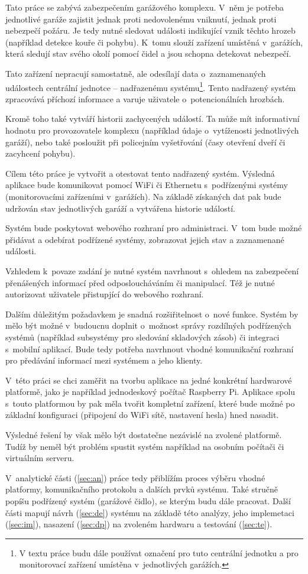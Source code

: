 Tato práce se zabývá zabezpečením garážového komplexu. V~něm je potřeba jednotlivé garáže zajistit jednak proti nedovolenému vniknutí, jednak proti nebezpečí požáru. Je tedy nutné sledovat události indikující vznik těchto hrozeb (například detekce kouře či pohybu). K~tomu slouží zařízení umístěná v~garážích, která sledují stav svého okolí pomocí čidel a jsou schopna detekovat nebezpečí. 

Tato zařízení nepracují samostatně, ale odesílají data o~zaznamenaných událostech centrální jednotce -- nadřazenému systému\footnote{V textu práce budu dále používat označení  pro tuto centrální jednotku a  pro monitorovací zařízení umístěna v~jednotlivých garážích.}. Tento nadřazený systém zpracovává příchozí informace a varuje uživatele o~potencionálních hrozbách.

Kromě toho také vytváří historii zachycených událostí. Ta může mít informativní hodnotu pro provozovatele komplexu (například údaje o~vytíženosti jednotlivých garáží), nebo také posloužit při policejním vyšetřování (časy otevření dveří či zacyhcení pohybu).

Cílem této práce je vytvořit a otestovat tento nadřazený systém. Výsledná aplikace bude komunikovat pomocí WiFi či Ethernetu s~podřízenými systémy (monitorovacími zařízeními v~garážích). Na základě získaných dat pak bude udržován stav jednotlivých garáží a vytvářena historie událostí.

Systém bude poskytovat webového rozhraní pro administraci. V~tom bude možné přidávat a odebírat podřízené systémy, zobrazovat jejich stav a zaznamenané události.

Vzhledem k~povaze zadání je nutné systém navrhnout s~ohledem na zabezpečení přenášených informací před odposloucháváním či manipulací. Též je nutné autorizovat uživatele přistupjící do webového rozhraní.

Dalším důležitým požadavkem je snadná rozšiřitelnost o~nové funkce. Systém by mělo být možné v~budoucnu doplnit o~možnost správy rozdílných podřízených systémů (například subsystémy pro sledování skladových zásob) či integraci s~mobilní aplikací. Bude tedy potřeba navrhnout vhodné komunikační rozhraní pro předávání informací mezi systémem a jeho klienty. 

V~této práci se chci zaměřit na tvorbu aplikace na jedné konkrétní hardwarové platformě, jako je například jednodeskový počítač Raspberry Pi. Aplikace spolu s~touto platformou by pak měla tvořit kompletní zařízení, které bude možné po základní konfiguraci (připojení do WiFi sítě, nastavení hesla) hned nasadit.

Výsledné řešení by však mělo být dostatečne nezávislé na zvolené platformě. Tudíž by neměl být problém spustit systém například na osobním počítači či virtuálním serveru.

V~analytické části (\ref{sec:an}) práce tedy přiblížím proces výběru vhodné platformy, komunikačního protokolu a dalších prvků systému. Také stručně popíšu podřízený systém (garážové čidlo), se kterým budu dále pracovat. Další části mapují návrh (\ref{sec:de}) systému na základě této analýzy, jeho implemetaci (\ref{sec:im}), nasazení (\ref{sec:dp}) na zvoleném hardwaru a testování (\ref{sec:te}).